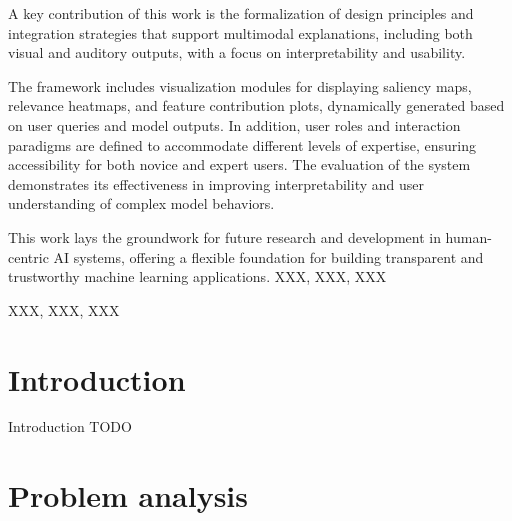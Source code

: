 \documentclass[
    bindingoffset=5mm,  %
    footnoteindent=3mm, %
    hyphenation=true    %
]{src/wut-thesis}
\begin{document}
A key contribution of this work is the formalization of design principles and integration strategies that support multimodal explanations, including both visual and auditory outputs, with a focus on interpretability and usability.

The framework includes visualization modules for displaying saliency maps, relevance heatmaps, and feature contribution plots, dynamically generated based on user queries and model outputs. In addition, user roles and interaction paradigms are defined to accommodate different levels of expertise, ensuring accessibility for both novice and expert users. The evaluation of the system demonstrates its effectiveness in improving interpretability and user understanding of complex model behaviors.

This work lays the groundwork for future research and development in human-centric AI systems, offering a flexible foundation for building transparent and trustworthy machine learning applications.
\keywords XXX, XXX, XXX

\clearpage
\secondabstract \kant[1-3]
\secondkeywords XXX, XXX, XXX

\pagestyle{plain}

\cleardoublepage %
\tableofcontents

\cleardoublepage %
\pagestyle{headings}

%
%
\clearpage %
\section{Introduction} \label{ch:introduction}

Introduction TODO

%
%
\clearpage %
\section{Problem analysis} \label{ch1:probAnalysis}
\end{document}
